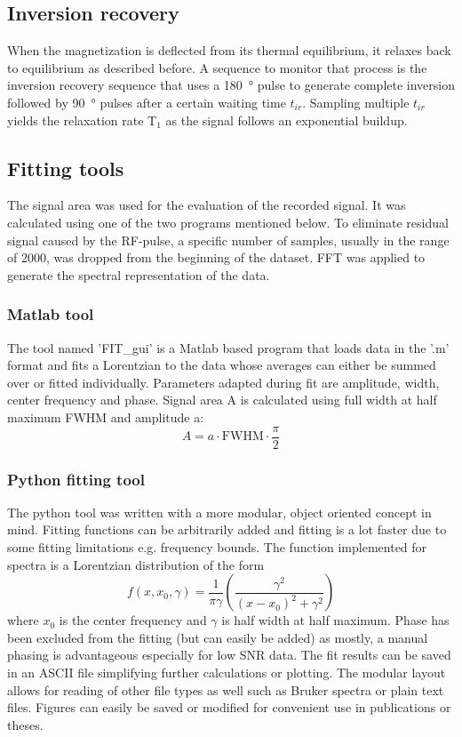         \subsection{Inversion recovery}
            When the magnetization is deflected from its thermal equilibrium, it relaxes back to equilibrium as described before. A sequence to monitor that process is the inversion recovery sequence that uses a \SI{180}{\degree} pulse to generate complete inversion followed by \SI{90}{\degree} pulses after a certain waiting time $t_{ir}$. Sampling multiple $t_{ir}$ yields the relaxation rate T$_1$ as the signal follows an exponential buildup.
        \subsection{Fitting tools}
            The signal area was used for the evaluation of the recorded signal. It was calculated using one of the two programs mentioned below. To eliminate residual signal caused by the RF-pulse, a specific number of samples, usually in the range of 2000, was dropped from the beginning of the dataset. FFT was applied to generate the spectral representation of the data.
            \subsubsection{Matlab tool}
            The tool named 'FIT\_gui' is a Matlab based program that loads data in the '.m' format and fits a Lorentzian to the data whose averages can either be summed over or fitted individually. Parameters adapted during fit are amplitude, width, center frequency and phase. Signal area A is calculated using full width at half maximum FWHM and amplitude a:
            \begin{equation}
                A=a\cdot\mathrm{FWHM}\cdot\frac{\pi}{2}
            \end{equation}
            \subsubsection{Python fitting tool}
            The python tool was written with a more modular, object oriented concept in mind. Fitting functions can be arbitrarily added and fitting is a lot faster due to some fitting limitations e.g. frequency bounds. The function implemented for spectra is a Lorentzian distribution of the form
            \begin{equation}
                f(x,x_0, \gamma) = \frac{1}{\pi\gamma}\left(\frac{\gamma^2}{(x-x_0)^2+\gamma^2}\right)
            \end{equation}
            where $x_0$ is the center frequency and $\gamma$ is half width at half maximum.
            Phase has been excluded from the fitting (but can easily be added) as mostly, a manual phasing is advantageous especially for low SNR data. The fit results can be saved in an ASCII file simplifying further calculations or plotting.
            The modular layout allows for reading of other file types as well such as Bruker spectra or plain text files.
            Figures can easily be saved or modified for convenient use in publications or theses.
